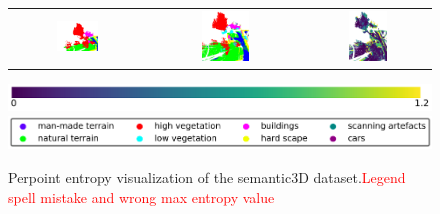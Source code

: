 \begin{figure}[h!]
\begin{tabular}{ccc}
            \includegraphics[width=0.33\textwidth, height=0.18\textheight]{images/seg_output/sem3d_seg_output/3_GT.pdf} &
            \includegraphics[width=0.33\textwidth, height=0.18\textheight]{images/seg_output/flipout/sem3d_3.pdf}& 
            \includegraphics[width=0.33\textwidth, height=0.18\textheight]{images/seg_output/sem3d_seg_output/ent_fout_3.pdf}\\
        \end{tabular}
        \includegraphics[scale=0.45]{images/ent_legend.pdf}
        \includegraphics[scale=0.45]{images/legend.png}
        \caption{Perpoint entropy visualization of the semantic3D dataset.\textcolor{red}{Legend spell mistake and wrong max entropy value}}
        \label{fig:fout_sem3d_entmap}
    \end{figure}
